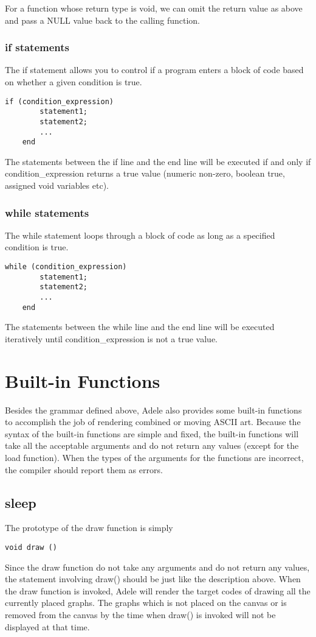 \documentclass[11pt,letterpaper]{article}
\begin{document}
For a function whose return type is void, we can omit the return value as above and pass a NULL value back to the calling function.


\subsubsection {if statements}
The if statement allows you to control if a program enters a block of code based on whether a given condition is true. 

\begin{lstlisting}[tabsize=4]
	if (condition_expression)
   		statement1;
   		statement2;
		...
	end
\end{lstlisting}

The statements between the if line and the end line will be executed if and only if condition\_expression returns a true value (numeric non-zero, boolean true, assigned void variables etc).

\subsubsection {while statements}
The while statement loops through a block of code as long as a specified condition is true.

\begin{lstlisting}[tabsize=4]
	while (condition_expression)
   		statement1;
	   	statement2;
		...
	end
\end{lstlisting}

The statements between the while line and the end line will be executed iteratively until condition\_expression is not a true value.

\section {Built-in Functions}
Besides the grammar defined above, Adele also provides some built-in functions to accomplish the job of rendering combined or moving ASCII art. Because the syntax of the built-in functions are simple and fixed, the built-in functions will take all the acceptable arguments and do not return any values (except for the load function). When the types of the arguments for the functions are incorrect, the compiler should report them as errors.

\subsection {sleep}
The prototype of the draw function is simply
\begin{lstlisting}[tabsize=4]
	void draw ()
\end{lstlisting}
Since the draw function do not take any arguments and do not return any values, the statement involving draw() should be just like the description above. When the draw function is invoked, Adele will render the target codes of drawing all the currently placed graphs. The graphs which is not placed on the canvas or is removed from the canvas by the time when draw() is invoked will not be displayed at that time.
\end{document}
